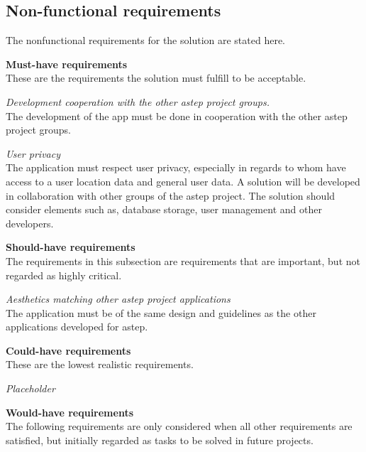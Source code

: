 \subsection{Non-functional requirements}
The nonfunctional requirements for the solution are stated here.

\textbf{Must-have requirements}\\
These are the requirements the solution must fulfill to be acceptable.

\textit{Development cooperation with the other \gls{astep} project groups.}\\
The development of the app must be done in cooperation with the other \gls{astep} project groups.

\textit{User privacy}\\
The application must respect user privacy, especially in regards  to whom have access to a user location data and general user data.
A solution will be developed in collaboration with other groups of the \gls{astep} project. The solution should consider elements such as, database storage, user management and other developers.

\textbf{Should-have requirements}\\
The requirements in this subsection are requirements that are important, but not regarded as highly critical.

\textit{Aesthetics matching other \gls{astep} project applications}\\
The application must be of the same design and guidelines as the other applications developed for \gls{astep}.

\textbf{Could-have requirements}\\
These are the lowest realistic requirements. 

\textit{Placeholder}\\

\textbf{Would-have requirements}\\
The following requirements are only considered when all other requirements are satisfied, but initially regarded as tasks to be solved in future projects.

